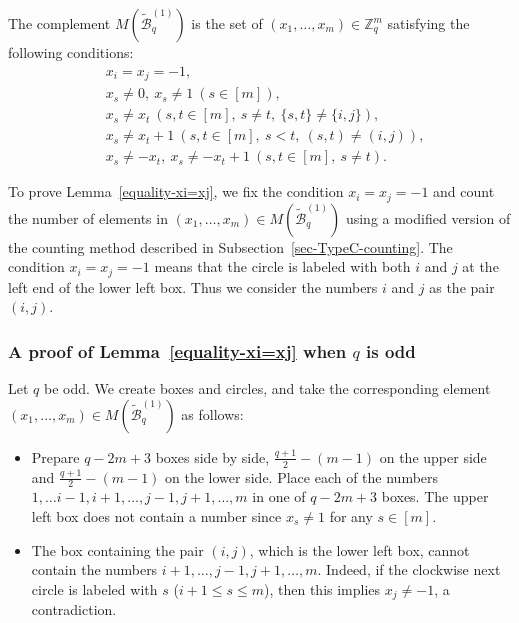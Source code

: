 \documentclass{article}
\theoremstyle{plain}
\theoremstyle{definition}
\theoremstyle{remark}
\numberwithin{equation}{section}
\newcommand{\ZZ}{\mathbb{Z}}
\begin{document}
\bigskip

The complement $M(\mathcal{\widetilde{B}}^{(1)}_q)$ is the set of $(x_1,\dots,x_m)\in\ZZ_q^m$ satisfying the following conditions:
\begin{align*}
&x_i=x_j=-1,\\ 
&x_s\neq 0,\ x_s\neq 1\ (s\in [m]),\\
&x_s\neq x_t\ (s,t\in [m],\ s\neq t,\ \{s,t\}\neq \{i,j\}),\\
&x_s\neq x_t+1\ (s,t\in [m],\ s<t,\ (s,t)\neq (i,j)),\\
&x_s\neq -x_t,\ x_s\neq -x_t+1\ (s,t\in [m],\ s\neq t).
\end{align*}

To prove Lemma~\ref{equality-xi=xj}, we fix the condition $x_i=x_j=-1$ and count the number of elements in $(x_1,\dots,x_m)\in M(\mathcal{\widetilde{B}}^{(1)}_q)$ using a modified version of the counting method described in Subsection~\ref{sec-TypeC-counting}.
The condition $x_i=x_j=-1$ means that the circle is labeled with both $i$ and $j$ at the left end of the lower left box.
Thus we consider the numbers $i$ and $j$ as the pair $(i,j)$.

\subsubsection{A proof of Lemma~\ref{equality-xi=xj} when $q$ is odd}\label{sec-quasi-poly-restxi=xj-odd}
Let $q$ be odd.
We create boxes and circles, and take the corresponding element $(x_1,\dots,x_m)\in M(\mathcal{\widetilde{B}}^{(1)}_q)$ as follows:
\begin{itemize}
\item Prepare $q-2m+3$ boxes side by side, $\displaystyle \frac{q+1}{2}-(m-1)$ on the upper side and $\displaystyle \frac{q+1}{2}-(m-1)$ on the lower side.
Place each of the numbers $1,\dots i-1, i+1, \dots,j-1,j+1,\dots,m$ in one of $q-2m+3$ boxes.
The upper left box does not contain a number since $x_s \neq 1$ for any $s\in [m]$.
\end{itemize}
\begin{itemize}
\item The box containing the pair $(i,j)$, which is the lower left box, cannot contain the numbers $i+1,\dots,j-1, j+1,\dots,m$.
Indeed, %
if the clockwise next circle is labeled with $s$ ($i+1 \leq s \leq m$), then this implies $x_j \neq -1$, a contradiction. 
\end{itemize}
\end{document}
